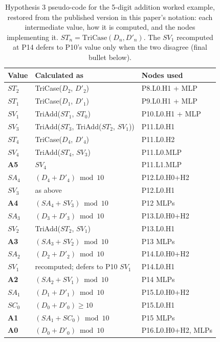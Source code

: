 \documentclass[11pt]{article}
\begin{document}
\begin{table}[ht]
    \centering
    \caption{Hypothesis 3 pseudo-code for the 5-digit addition worked example, restored from the published version in this paper's notation: each intermediate value, how it is computed, and the nodes implementing it. $ST_n = \mathrm{TriCase}(D_n, D'_n)$. The $SV_1$ recomputed at P14 defers to P10's value only when the two disagree (final bullet below).}
    \label{tab:Hypothesis3A5A4}
    \vspace{0.1in}
    \small
    \begin{tabularx}{\columnwidth}{p{0.7cm} p{3.6cm} p{2.6cm}}
         \textbf{Value} & \textbf{Calculated as} & \textbf{Nodes used} \\
         \hline
         $ST_2$ & TriCase($D_2$, $D'_2$) & P8.L0.H1 + MLP \\
         $ST_1$ & TriCase($D_1$, $D'_1$) & P9.L0.H1 + MLP \\
         $SV_1$ & TriAdd($ST_1$, $ST_0$) & P10.L0.H1 + MLP \\
         $SV_3$ & TriAdd($ST_3$, TriAdd($ST_2$, $SV_1$)) & P11.L0.H1 \\
         $ST_4$ & TriCase($D_4$, $D'_4$) & P11.L0.H2 \\
         $SV_4$ & TriAdd($ST_4$, $SV_3$) & P11.L0.MLP \\
         \textbf{A5} & $SV_4$ & P11.L1.MLP \\
         \hline
         $SA_4$ & $(D_4 + D'_4) \bmod 10$ & P12.L0.H0+H2 \\
         $SV_3$ & as above & P12.L0.H1 \\
         \textbf{A4} & $(SA_4 + SV_3) \bmod 10$ & P12 MLPs \\
         \hline
         $SA_3$ & $(D_3 + D'_3) \bmod 10$ & P13.L0.H0+H2 \\
         $SV_2$ & TriAdd($ST_2$, $SV_1$) & P13.L0.H1 \\
         \textbf{A3} & $(SA_3 + SV_2) \bmod 10$ & P13 MLPs \\
         \hline
         $SA_2$ & $(D_2 + D'_2) \bmod 10$ & P14.L0.H0+H2 \\
         $SV_1$ & recomputed; defers to P10 $SV_1$ & P14.L0.H1 \\
         \textbf{A2} & $(SA_2 + SV_1) \bmod 10$ & P14 MLPs \\
         \hline
         $SA_1$ & $(D_1 + D'_1) \bmod 10$ & P15.L0.H0+H2 \\
         $SC_0$ & $(D_0 + D'_0) \geq 10$ & P15.L0.H1 \\
         \textbf{A1} & $(SA_1 + SC_0) \bmod 10$ & P15 MLPs \\
         \hline
         \textbf{A0} & $(D_0 + D'_0) \bmod 10$ & P16.L0.H0+H2, MLPs \\
         \hline
    \end{tabularx}
\end{table}
\end{document}
